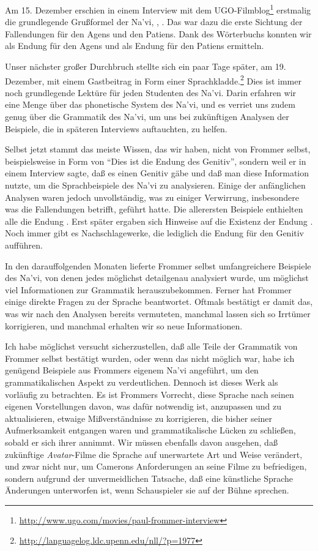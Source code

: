 Am 15. Dezember erschien in einem Interview mit dem UGO-Filmblog\footnote{
\url{http://www.ugo.com/movies/paul-frommer-interview}} erstmalig die
grundlegende Gru\ss{}formel der Na’vi, , .
Das war dazu die erste Sichtung der Fallendungen f\"ur den Agens und den
Patiens. Dank des W\"orterbuchs konnten wir  als Endung f\"ur den
Agens und  als Endung f\"ur den Patiens ermitteln.

Unser n\"achster gro\ss{}er Durchbruch stellte sich ein paar Tage sp\"ater,
am 19. Dezember, mit einem Gastbeitrag in Form einer Sprachkladde.\footnote{
\url{http://languagelog.ldc.upenn.edu/nll/?p=1977}}
Dies ist immer noch grundlegende Lekt\"ure f\"ur jeden Studenten des Na’vi.
Darin erfahren wir eine Menge \"uber das phonetische System des Na’vi, und
es verriet uns zudem genug \"uber die Grammatik des Na’vi, um uns bei
zuk\"unftigen Analysen der Beispiele, die in sp\"ateren Interviews
auftauchten, zu helfen.

Selbst jetzt stammt das meiste Wissen, das wir haben, nicht von Frommer
selbst, beispielsweise in Form von "`Dies ist die Endung des Genitiv"',
sondern weil er in einem Interview sagte, da\ss{} es einen Genitiv g\"abe
und da\ss{} man diese Information nutzte, um die Sprachbeispiele des Na’vi
zu analysieren. Einige der anf\"anglichen Analysen waren jedoch
unvollst\"andig, was zu einiger Verwirrung, insbesondere was die Fallendungen
betrifft, gef\"uhrt hatte. Die allerersten Beispiele enthielten alle die
Endung . Erst sp\"ater ergaben sich Hinweise auf die Existenz der
Endung . Noch immer gibt es Nachschlagewerke, die lediglich die
Endung  f\"ur den Genitiv auff\"uhren.

In den darauffolgenden Monaten lieferte Frommer selbst umfangreichere
Beispiele des Na’vi, von denen jedes m\"oglichst detailgenau analysiert
wurde, um m\"oglichst viel Informationen zur Grammatik herauszubekommen.
Ferner hat Frommer einige direkte Fragen zu der Sprache beantwortet. Oftmals
best\"atigt er damit das, was wir nach den Analysen bereits vermuteten,
manchmal lassen sich so Irrt\"umer korrigieren, und manchmal erhalten wir so
neue Informationen.

Ich habe m\"oglichst versucht sicherzustellen, da\ss{} alle Teile der
Grammatik von Frommer selbst best\"atigt wurden, oder wenn das nicht m\"oglich
war, habe ich gen\"ugend Beispiele aus Frommers eigenem Na’vi angef\"uhrt,
um den grammatikalischen Aspekt zu verdeutlichen. Dennoch ist dieses Werk als
vorl\"aufig zu betrachten. Es ist Frommers Vorrecht, diese Sprache nach seinen
eigenen Vorstellungen davon, was daf\"ur notwendig ist, anzupassen
und zu aktualisieren, etwaige Mi\ss{}verst\"andnisse zu korrigieren, die
bisher seiner Aufmerksamkeit entgangen waren und grammatikalische L\"ucken zu
schlie\ss{}en, sobald er sich ihrer annimmt. Wir m\"ussen ebenfalls davon
ausgehen, da\ss{} zuk\"unftige \textit{Avatar}-Filme die Sprache auf
unerwartete Art und Weise ver\"andert, und zwar nicht nur, um Camerons
Anforderungen an seine Filme zu befriedigen, sondern aufgrund der
unvermeidlichen Tatsache, da\ss{} eine k\"unstliche Sprache \"Anderungen
unterworfen ist, wenn Schauspieler sie auf der B\"uhne sprechen.


